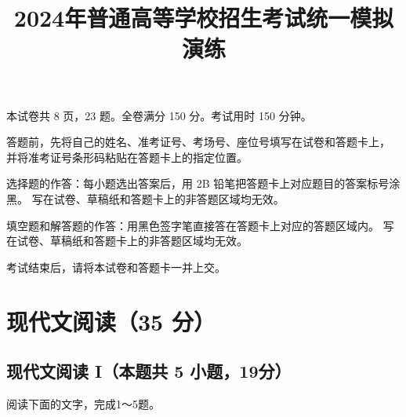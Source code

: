 \documentclass[zihao = -4]{exam-zh}
\title{2024年普通高等学校招生考试统一模拟演练}
\begin{document}
       \secret

       \maketitle
       本试卷共 8 页，23 题。全卷满分 150 分。考试用时 150 分钟。


       \begin{notice}
         \item 答题前，先将自己的姓名、准考证号、考场号、座位号填写在试卷和答题卡上，
           并将准考证号条形码粘贴在答题卡上的指定位置。
         \item 选择题的作答：每小题选出答案后，用 2B 铅笔把答题卡上对应题目的答案标号涂黑。
           写在试卷、草稿纸和答题卡上的非答题区域均无效。
         \item 填空题和解答题的作答：用黑色签字笔直接答在答题卡上对应的答题区域内。
           写在试卷、草稿纸和答题卡上的非答题区域均无效。
         \item 考试结束后，请将本试卷和答题卡一并上交。
       \end{notice}



       \section{现代文阅读（35 分）}

       \subsection{现代文阅读 I（本题共 5 小题，19分）}

       阅读下面的文字，完成1～5题。
\end{document}
